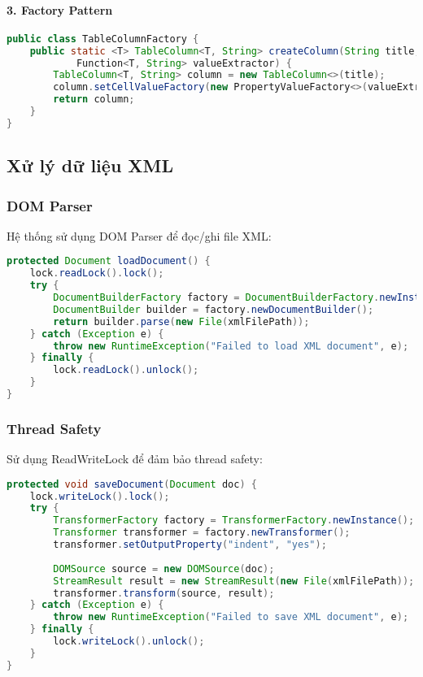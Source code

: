 \documentclass[12pt,a4paper]{article}
\begin{document}
\paragraph{3. Factory Pattern}
\begin{lstlisting}[language=Java, caption=Ví dụ TableColumnFactory]
public class TableColumnFactory {
    public static <T> TableColumn<T, String> createColumn(String title, 
            Function<T, String> valueExtractor) {
        TableColumn<T, String> column = new TableColumn<>(title);
        column.setCellValueFactory(new PropertyValueFactory<>(valueExtractor));
        return column;
    }
}
\end{lstlisting}

\subsection{Xử lý dữ liệu XML}

\subsubsection{DOM Parser}

Hệ thống sử dụng DOM Parser để đọc/ghi file XML:

\begin{lstlisting}[language=Java, caption=Ví dụ đọc XML]
protected Document loadDocument() {
    lock.readLock().lock();
    try {
        DocumentBuilderFactory factory = DocumentBuilderFactory.newInstance();
        DocumentBuilder builder = factory.newDocumentBuilder();
        return builder.parse(new File(xmlFilePath));
    } catch (Exception e) {
        throw new RuntimeException("Failed to load XML document", e);
    } finally {
        lock.readLock().unlock();
    }
}
\end{lstlisting}

\subsubsection{Thread Safety}

Sử dụng ReadWriteLock để đảm bảo thread safety:

\begin{lstlisting}[language=Java, caption=Ví dụ Thread Safety]
protected void saveDocument(Document doc) {
    lock.writeLock().lock();
    try {
        TransformerFactory factory = TransformerFactory.newInstance();
        Transformer transformer = factory.newTransformer();
        transformer.setOutputProperty("indent", "yes");
        
        DOMSource source = new DOMSource(doc);
        StreamResult result = new StreamResult(new File(xmlFilePath));
        transformer.transform(source, result);
    } catch (Exception e) {
        throw new RuntimeException("Failed to save XML document", e);
    } finally {
        lock.writeLock().unlock();
    }
}
\end{lstlisting}
\end{document}
